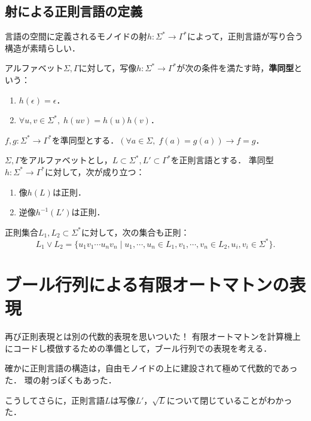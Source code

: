 \subsection{射による正則言語の定義}

\begin{tcolorbox}[colframe=ForestGreen, colback=ForestGreen!10!white, breakable]
    言語の空間に定義されるモノイドの射$h:\Sigma^*\to\Gamma^*$によって，正則言語が写り合う構造が素晴らしい．
\end{tcolorbox}

\begin{definition}[モノイドの射]
    アルファベット$\Sigma,\Gamma$に対して，写像$h:\Sigma^*\to\Gamma^*$が次の条件を満たす時，\textbf{準同型}という：
    \begin{enumerate}
        \item $h(\epsilon)=\epsilon$．
        \item $\forall u,v\in\Sigma^*,\;h(uv)=h(u)h(v)$．
    \end{enumerate}
\end{definition}

\begin{proposition}[モノイドの基底]
    $f,g:\Sigma^*\to\Gamma^*$を準同型とする．$(\forall a\in\Sigma,\;f(a)=g(a))\rightarrow f=g$．
\end{proposition}

\begin{theorem}
    $\Sigma,\Gamma$をアルファベットとし，$L\subset\Sigma^*,L'\subset\Gamma^*$を正則言語とする．
    準同型$h:\Sigma^*\to\Gamma^*$に対して，次が成り立つ：
    \begin{enumerate}
        \item 像$h(L)$は正則．
        \item 逆像$h^{-1}(L')$は正則．
    \end{enumerate}
\end{theorem}

\begin{proposition}[shuffle]
    正則集合$L_1,L_2\subset\Sigma^*$に対して，次の集合も正則：
    \[ L_1\lor L_2=\{u_1v_1\cdots u_nv_n\mid u_1,\cdots,u_n\in L_1,v_1,\cdots,v_n\in L_2, u_i,v_i\in\Sigma^*\}. \]
\end{proposition}

\section{ブール行列による有限オートマトンの表現}

\begin{tcolorbox}[colframe=ForestGreen, colback=ForestGreen!10!white, breakable,
    title=算譜に特性関数のアイデアが使えるので，NFAはBool行列のデータ構造に翻訳できる]
    再び正則表現とは別の代数的表現を思いついた！
    有限オートマトンを計算機上にコードし模倣するための準備として，ブール行列での表現を考える．
    
    確かに正則言語の構造は，自由モノイドの上に建設されて極めて代数的であった．
    環の射っぽくもあった．

    こうしてさらに，正則言語$L$は写像$L'$，$\sqrt{L}$について閉じていることがわかった．
\end{tcolorbox}

